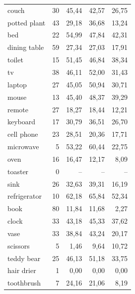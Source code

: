 \begin{longtable}{lrrrr}
couch & 30 & 45{,}44 & 42{,}57 & 26{,}75 \\
potted plant & 43 & 29{,}18 & 36{,}68 & 13{,}24 \\
bed & 22 & 54{,}99 & 47{,}84 & 42{,}31 \\
dining table & 59 & 27{,}34 & 27{,}03 & 17{,}91 \\
toilet & 15 & 51{,}45 & 46{,}84 & 38{,}34 \\
tv & 38 & 46{,}11 & 52{,}00 & 31{,}43 \\
laptop & 27 & 45{,}05 & 50{,}94 & 30{,}71 \\
mouse & 13 & 45{,}40 & 48{,}37 & 39{,}29 \\
remote & 27 & 18{,}27 & 18{,}44 & 12{,}21 \\
keyboard & 17 & 30{,}79 & 36{,}51 & 26{,}70 \\
cell phone & 23 & 28{,}51 & 20{,}36 & 17{,}71 \\
microwave & 5 & 53{,}22 & 60{,}44 & 22{,}75 \\
oven & 16 & 16{,}47 & 12{,}17 & 8{,}09 \\
toaster & 0 & -- & -- & -- \\
sink & 26 & 32{,}63 & 39{,}31 & 16{,}19 \\
refrigerator & 10 & 62{,}18 & 65{,}84 & 52{,}34 \\
book & 80 & 11{,}84 & 11{,}68 & 2{,}27 \\
clock & 33 & 43{,}18 & 45{,}33 & 37{,}62 \\
vase & 33 & 38{,}84 & 43{,}24 & 20{,}17 \\
scissors & 5 & 1{,}46 & 9{,}64 & 10{,}72 \\
teddy bear & 25 & 46{,}13 & 51{,}18 & 33{,}75 \\
hair drier & 1 & 0{,}00 & 0{,}00 & 0{,}00 \\
toothbrush & 7 & 24{,}16 & 21{,}06 & 8{,}19 \\
\bottomrule\end{longtable}\normalsize
